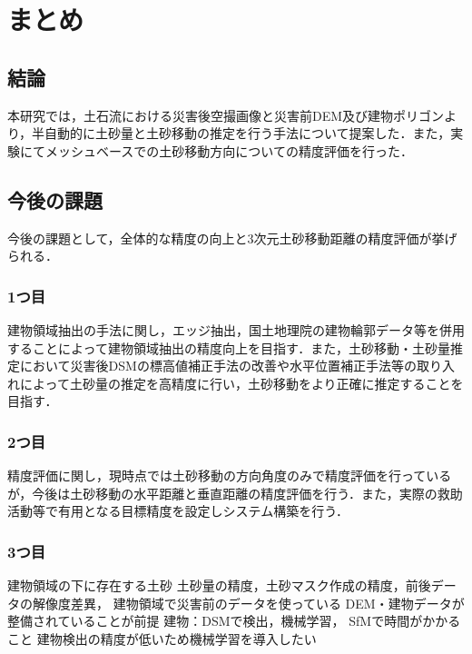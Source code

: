 \chapter{まとめ}
  \section{結論}
    本研究では，土石流における災害後空撮画像と災害前DEM及び建物ポリゴンより，半自動的に土砂量と土砂移動の推定を行う手法について提案した．また，実験にてメッシュベースでの土砂移動方向についての精度評価を行った．



  \section{今後の課題}
    今後の課題として，全体的な精度の向上と3次元土砂移動距離の精度評価が挙げられる．


    \subsection*{1つ目}
      建物領域抽出の手法に関し，エッジ抽出，国土地理院の建物輪郭データ等を併用することによって建物領域抽出の精度向上を目指す．また，土砂移動・土砂量推定において災害後DSMの標高値補正手法の改善や水平位置補正手法\cite{土砂量解析1}等の取り入れによって土砂量の推定を高精度に行い，土砂移動をより正確に推定することを目指す．


    \subsection*{2つ目}
      精度評価に関し，現時点では土砂移動の方向角度のみで精度評価を行っているが，今後は土砂移動の水平距離と垂直距離の精度評価を行う．また，実際の救助活動等で有用となる目標精度を設定しシステム構築を行う．

      
    \subsection*{3つ目}
      建物領域の下に存在する土砂
      土砂量の精度，土砂マスク作成の精度，前後データの解像度差異，
      建物領域で災害前のデータを使っている
      DEM・建物データが整備されていることが前提
        建物：DSMで検出，機械学習，
      SfMで時間がかかること
      建物検出の精度が低いため機械学習を導入したい
